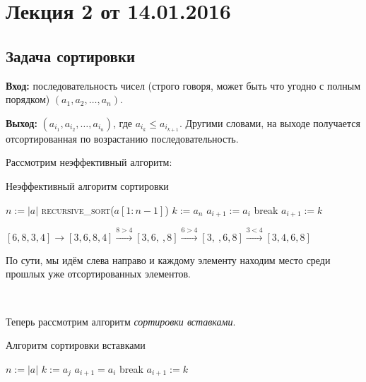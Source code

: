 


	
\section*{Лекция 2 от 14.01.2016}

\subsection*{Задача сортировки}
\textbf{Вход:} последовательность чисел (строго говоря, может быть что угодно с полным порядком) $(a_1, a_2, \ldots, a_n)$.

\textbf{Выход:} $(a_{i_1}, a_{i_2}, \ldots, a_{i_n})$, где $a_{i_k} \leq a_{i_{k+1}}$. Другими словами, на выходе получается отсортированная по возрастанию последовательность. 

Рассмотрим неэффективный алгоритм:

\begin{algorithm}
\caption{Неэффективный алгоритм сортировки}
\begin{algorithmic}[1]
\State $n \mathrel{:=} |a|$
    \State \textsc{recursive\_sort}($a[1:n-1]$)
    \State $k \mathrel{:=} a_n$
            \State $a_{i+1} \mathrel{:=} a_{i}$
        \Else
            \State break
        \EndIf
        \State $a_{i+1} \mathrel{:=} k$
    \EndFor
\EndIf
\EndFunction
\end{algorithmic}
\end{algorithm}

$[6,8,3,4] \to [3,6,8,4] \xrightarrow{8>4} [3,6,\ ,8] \xrightarrow{6>4}[3,\ ,6,8] \xrightarrow {3<4}[3,4,6,8]$

По сути, мы идём слева направо и каждому элементу находим место среди прошлых уже отсортированных элементов.

\

Теперь рассмотрим алгоритм \emph{сортировки вставками}.

\begin{algorithm}
\caption{Алгоритм сортировки вставками}
\begin{algorithmic}[1]
\State $n \mathrel{:=} |a|$
    \State $k \mathrel{:=} a_j$
            \State $a_{i+1} = a_i$
        \Else
            \State break
        \EndIf
        \State $a_{i+1} \mathrel{:=} k$
    \EndFor
\EndFor
\EndFunction
\end{algorithmic}
\end{algorithm}

